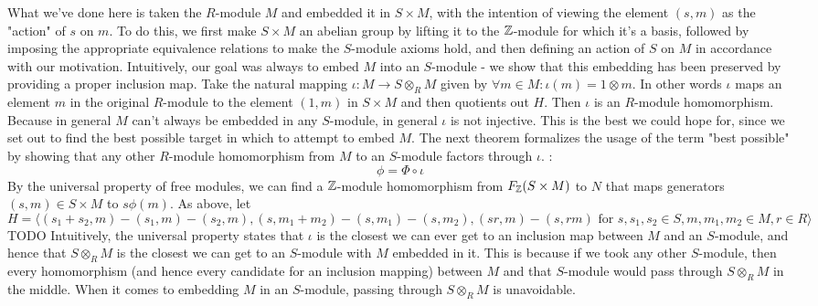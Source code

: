 \documentclass{article}
\begin{document}
What we've done here is taken the $ R $-module $ M $ and embedded it in $ S \times M $, with the intention of viewing the element $ (s, m) $ as the "action" of $ s $ on $ m $. To do this, we first make $ S \times M $ an abelian group by lifting it to the $ \mathbb{Z} $-module for which it's a basis, followed by imposing the appropriate equivalence relations to make the $ S $-module axioms hold, and then defining an action of $ S $ on $ M $ in accordance with our motivation. Intuitively, our goal was always to embed $ M $ into an $ S $-module - we show that this embedding has been preserved by providing a proper inclusion map. Take the natural mapping $ \iota: M \rightarrow S \otimes_R M $ given by $ \forall m \in M: \iota(m) = 1 \otimes m $. In other words $ \iota $ maps an element $ m $ in the original $ R $-module to the element $ (1, m) $ in $ S \times M $ and then quotients out $ H $. Then $ \iota $ is an $ R $-module homomorphism. Because in general $ M $ can't always be embedded in any $ S $-module, in general $ \iota $ is not injective. This is the best we could hope for, since we set out to find the best possible target in which to attempt to embed $ M $. The next theorem formalizes the usage of the term "best possible" by showing that any other $ R $-module homomorphism from $ M $ to an $ S $-module factors through $ \iota $.
\nn
{}: 
$$ \phi = \Phi \circ \iota $$
\indent {}
\n
\Pf By the universal property of free modules, we can find a $ \mathbb{Z} $-module homomorphism from $ F_{\mathbb{Z}}(S \times M) $ to $ N $ that maps generators $ (s, m) \in S \times M $ to $ s \phi(m) $. As above, let
$$ H = \big \langle (s_1 + s_2, m) - (s_1, m) - (s_2, m), (s, m_1 + m_2) - (s, m_1) - (s, m_2), (s r, m) - (s, r m) \text{ for } s, s_1, s_2 \in S, m, m_1, m_2 \in M, r \in R \big \rangle $$
TODO
\n
\In Intuitively, the universal property states that $ \iota $ is the closest we can ever get to an inclusion map between $ M $ and an $ S $-module, and hence that $ S \otimes_R M $ is the closest we can get to an $ S $-module with $ M$ embedded in it. This is because if we took any other $ S $-module, then every homomorphism (and hence every candidate for an inclusion mapping) between $ M $ and that $ S $-module would pass through $ S \otimes_R M $ in the middle. When it comes to embedding $ M $ in an $ S $-module, passing through $ S \otimes_R M $ is unavoidable.
\end{document}
